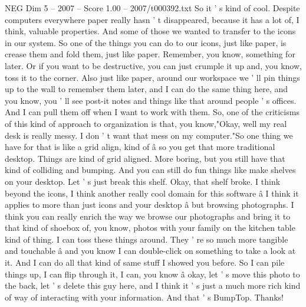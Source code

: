 \begin{textsample}{NEG Dim 5 – 2007 – Score 1.00 – 2007/t000392.txt}
So it ' s kind of cool.
Despite computers everywhere paper really hasn ' t disappeared, because it has a lot of, I think, valuable properties.
And some of those we wanted to transfer to the icons in our system.
So one of the things you can do to our icons, just like paper, is crease them and fold them, just like paper.
Remember, you know, something for later.
Or if you want to be destructive, you can just crumple it up and, you know, toss it to the corner.
Also just like paper, around our workspace we ' ll pin things up to the wall to remember them later, and I can do the same thing here, and you know, you ' ll see post-it notes and things like that around people ' s offices.
And I can pull them off when I want to work with them.
So, one of the criticisms of this kind of approach to organization is that, you know,"Okay, well my real desk is really messy.
I don ' t want that mess on my computer."So one thing we have for that is like a grid align, kind of â so you get that more traditional desktop.
Things are kind of grid aligned.
More boring, but you still have that kind of colliding and bumping.
And you can still do fun things like make shelves on your desktop.
Let ' s just break this shelf.
Okay, that shelf broke.
I think beyond the icons, I think another really cool domain for this software â I think it applies to more than just icons and your desktop â but browsing photographs.
I think you can really enrich the way we browse our photographs and bring it to that kind of shoebox of, you know, photos with your family on the kitchen table kind of thing.
I can toss these things around.
They ' re so much more tangible and touchable â and you know I can double-click on something to take a look at it.
And I can do all that kind of same stuff I showed you before.
So I can pile things up, I can flip through it, I can, you know â okay, let ' s move this photo to the back, let ' s delete this guy here, and I think it ' s just a much more rich kind of way of interacting with your information.
And that ' s BumpTop.
Thanks!

\end{textsample}
